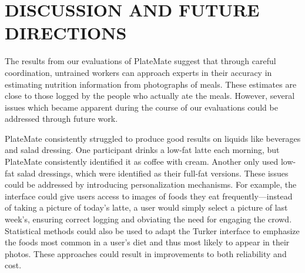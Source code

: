\section{DISCUSSION AND FUTURE DIRECTIONS}

The results from our evaluations of PlateMate suggest that through careful coordination, untrained workers can approach experts in their accuracy in estimating nutrition information from photographs of meals. These estimates are close to those logged by the people who actually ate the meals. However, several issues which became apparent during the course of our evaluations could be addressed through future work.

PlateMate consistently struggled to produce good results on liquids like beverages and salad dressing. One participant drinks a low-fat latte each morning, but PlateMate consistently identified it as coffee with cream.  Another only used low-fat salad dressings, which were identified as their full-fat versions.  These issues could be addressed by introducing personalization mechanisms.  For example, the interface could give users access to images of foods they eat frequently---instead of taking a picture of today's latte, a user would simply select a picture of last week's, ensuring correct logging and obviating the need for engaging the crowd. Statistical methods could also be used to adapt the Turker interface to emphasize the foods most common in a user's diet and thus most likely to appear in their photos.  These approaches could result in improvements to both reliability and cost.



